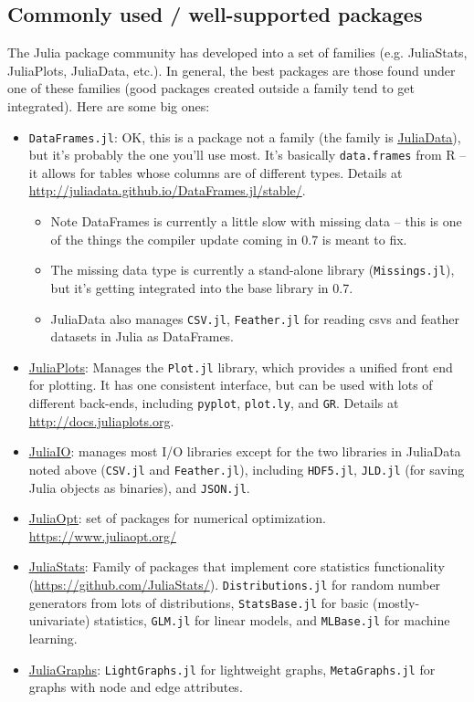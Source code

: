 \documentclass[12pt]{article}
\begin{document}
\subsection*{Commonly used / well-supported packages}
The Julia package community has developed into a set of families (e.g. JuliaStats, JuliaPlots, JuliaData, etc.). In general, the best packages are those found under one of these families (good packages created outside a family tend to get integrated). Here are some big ones:
\begin{itemize}
    \item \texttt{DataFrames.jl}: OK, this is a package not a family (the family is \href{https://github.com/JuliaData}{\underline{JuliaData}}), but it's probably the one you'll use most. It's basically \texttt{data.frames} from R -- it allows for tables whose columns are of different types. Details at \url{http://juliadata.github.io/DataFrames.jl/stable/}.
    \begin{itemize}
        \item Note DataFrames is currently a little slow with missing data -- this is one of the things the compiler update coming in 0.7 is meant to fix.
        \item The missing data type is currently a stand-alone library (\texttt{Missings.jl}), but it's getting integrated into the base library in 0.7.
        \item JuliaData also manages \texttt{CSV.jl}, \texttt{Feather.jl} for reading csvs and feather datasets in Julia as DataFrames.
    \end{itemize}
    \item \href{http://docs.juliaplots.org}{\underline{JuliaPlots}}: Manages the \texttt{Plot.jl} library, which provides a unified front end for plotting. It has one consistent interface, but can be used with lots of different back-ends, including \texttt{pyplot}, \texttt{plot.ly}, and \texttt{GR}. Details at \url{http://docs.juliaplots.org}.
    \item \href{https://github.com/JuliaIO/}{\underline{JuliaIO}}: manages most I/O libraries except for the two libraries in JuliaData noted above (\texttt{CSV.jl} and \texttt{Feather.jl}), including \texttt{HDF5.jl}, \texttt{JLD.jl} (for saving Julia objects as binaries), and \texttt{JSON.jl}.
    \item \href{https://www.juliaopt.org/}{\underline{JuliaOpt}}: set of packages for numerical optimization. \url{https://www.juliaopt.org/}
    \item \href{http://juliastats.github.io/}{\underline{JuliaStats}}: Family of packages that implement core statistics functionality (\url{https://github.com/JuliaStats/}). \texttt{Distributions.jl} for random number generators from lots of distributions, \texttt{StatsBase.jl} for basic (mostly-univariate) statistics, \texttt{GLM.jl} for linear models, and \texttt{MLBase.jl} for machine learning.
    \item \href{https://github.com/JuliaGraphs}{\underline{JuliaGraphs}}: \texttt{LightGraphs.jl} for lightweight graphs, \texttt{MetaGraphs.jl} for graphs with node and edge attributes.
\end{itemize}
\end{document}
